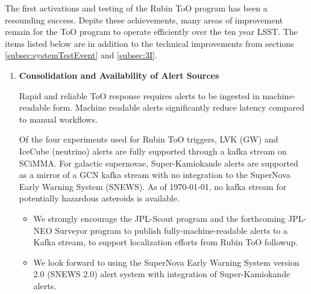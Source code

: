 The first activations and testing of the Rubin ToO program has been a resounding success. Depite these achievements, many areas of improvement remain for the ToO program to operate efficiently over the ten year LSST. The items listed below are in addition to the technical improvements from sections \ref{subsec:systemTestEvent} and \ref{subsec:3I}.

\begin{enumerate}




\item \textbf{Consolidation and Availability of Alert Sources}

Rapid and reliable ToO response requires alerts to be ingested in machine-readable form. Machine readable alerts significantly reduce latency compared to manual workflows.

Of the four experiments used for Rubin ToO triggers, LVK (GW) and IceCube (neutrino) alerts are fully supported through a kafka stream on SCiMMA. For galactic supernovae, Super-Kamiokande alerts are supported as a mirror of a GCN kafka stream with no integration to the SuperNova Early Warning System (SNEWS). As of \today, no kafka stream for potentially hazardous asteroids is available.
\begin{itemize}
    \item We strongly encourage the JPL-Scout program and the forthcoming JPL-NEO Surveyor program to publish fully-machine-readable alerts to a Kafka stream, to support localization efforts from Rubin ToO followup.
    \item We look forward to using the SuperNova Early Warning System version 2.0 (SNEWS 2.0) alert system with integration of Super-Kamiokande alerts.
\end{itemize}


\end{enumerate}
